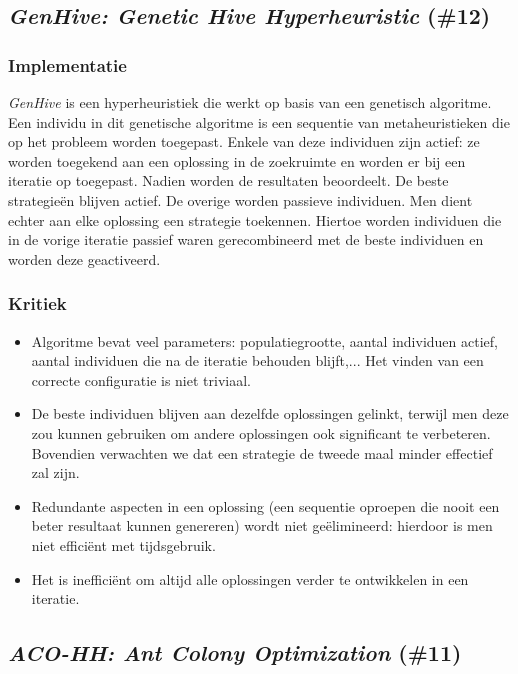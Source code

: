 \subsection{\emph{GenHive: Genetic Hive Hyperheuristic} (\#12)}
\label{sss:genhive}
\subsubsection{Implementatie}
\emph{GenHive}\cite{chesc-genhive} is een hyperheuristiek die werkt op basis van een genetisch algoritme. Een individu in dit genetische algoritme is een sequentie van metaheuristieken die op het probleem worden toegepast. Enkele van deze individuen zijn actief: ze worden toegekend aan een oplossing in de zoekruimte en worden er bij een iteratie op toegepast. Nadien worden de resultaten beoordeelt. De beste strategie\"en blijven actief. De overige worden passieve individuen. Men dient echter aan elke oplossing een strategie toekennen. Hiertoe worden individuen die in de vorige iteratie passief waren gerecombineerd met de beste individuen en worden deze geactiveerd.
\subsubsection{Kritiek}
\begin{itemize}
 \item Algoritme bevat veel parameters: populatiegrootte, aantal individuen actief, aantal individuen die na de iteratie behouden blijft,... Het vinden van een correcte configuratie is niet triviaal.
 \item De beste individuen blijven aan dezelfde oplossingen gelinkt, terwijl men deze zou kunnen gebruiken om andere oplossingen ook significant te verbeteren. Bovendien verwachten we dat een strategie de tweede maal minder effectief zal zijn.
 \item Redundante aspecten in een oplossing (een sequentie oproepen die nooit een beter resultaat kunnen genereren) wordt niet ge\"elimineerd: hierdoor is men niet effici\"ent met tijdsgebruik.
 \item Het is ineffici\"ent om altijd alle oplossingen verder te ontwikkelen in een iteratie.
\end{itemize}
\subsection{\emph{ACO-HH: Ant Colony Optimization} (\#11)}
\label{sss:aco-hh}
